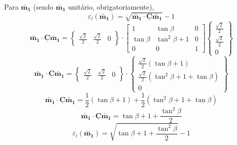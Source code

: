 \begin{enumerate}
    Para $\utilde{\mathbf{m_1}}$ (sendo $\utilde{\mathbf{m_1}}$ unitário, obrigatoriamente),
    \[\varepsilon_l(\utilde{\mathbf{m_1}})=\sqrt{\utilde{\mathbf{m_1}}\cdot\underline{\mathbf{C}}\utilde{\mathbf{m_1}}}-1\]
    \[
        \utilde{\mathbf{m_1}}\cdot\underline{\mathbf{C}}\utilde{\mathbf{m_1}}
        =
        \begin{Bmatrix}
            \frac{\sqrt{2}}{2} & \frac{\sqrt{2}}{2} & 0
        \end{Bmatrix}
        \cdot
        \begin{bmatrix}
            1 & \tan\beta & 0 \\
            \tan\beta & \tan^2\beta + 1 & 0 \\
            0 & 0 & 1
        \end{bmatrix}
        \begin{Bmatrix}
            \frac{\sqrt{2}}{2} \\ \frac{\sqrt{2}}{2} \\ 0
        \end{Bmatrix}
    \]
    \[
        \utilde{\mathbf{m_1}}\cdot\underline{\mathbf{C}}\utilde{\mathbf{m_1}}
        =
        \begin{Bmatrix}
            \frac{\sqrt{2}}{2} & \frac{\sqrt{2}}{2} & 0
        \end{Bmatrix}
        \cdot
        \begin{Bmatrix}
            \frac{\sqrt{2}}{2}(\tan\beta+1) \\ \frac{\sqrt{2}}{2}(\tan^2\beta+1+\tan\beta) \\ 0
        \end{Bmatrix}
    \]
    \[\utilde{\mathbf{m_1}}\cdot\underline{\mathbf{C}}\utilde{\mathbf{m_1}}=\frac{1}{2}(\tan\beta+1)+\frac{1}{2}(\tan^2\beta+1+\tan\beta)\]
    \[\utilde{\mathbf{m_1}}\cdot\underline{\mathbf{C}}\utilde{\mathbf{m_1}}=\tan\beta+1+\frac{\tan^2\beta}{2}\]
    \[\varepsilon_l(\utilde{\mathbf{m_1}})=\sqrt{\tan\beta+1+\frac{\tan^2\beta}{2}}-1\]


\end{enumerate}
